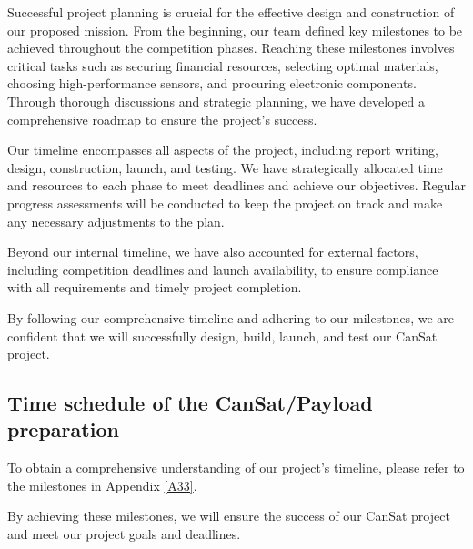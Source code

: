 Successful project planning is crucial for the effective design and construction of our proposed mission. From the beginning, our team defined key milestones to be achieved throughout the competition phases. Reaching these milestones involves critical tasks such as securing financial resources, selecting optimal materials, choosing high-performance sensors, and procuring electronic components. Through thorough discussions and strategic planning, we have developed a comprehensive roadmap to ensure the project's success.

Our timeline encompasses all aspects of the project, including report writing, design, construction, launch, and testing. We have strategically allocated time and resources to each phase to meet deadlines and achieve our objectives. Regular progress assessments will be conducted to keep the project on track and make any necessary adjustments to the plan.

Beyond our internal timeline, we have also accounted for external factors, including competition deadlines and launch availability, to ensure compliance with all requirements and timely project completion.

By following our comprehensive timeline and adhering to our milestones, we are confident that we will successfully design, build, launch, and test our CanSat project.

\subsection{Time schedule of the CanSat/Payload preparation}\label{time_schedule}
To obtain a comprehensive understanding of our project's timeline, please refer to the milestones in Appendix \ref{A33}. 

By achieving these milestones, we will ensure the success of our CanSat project and meet our project goals and deadlines.

